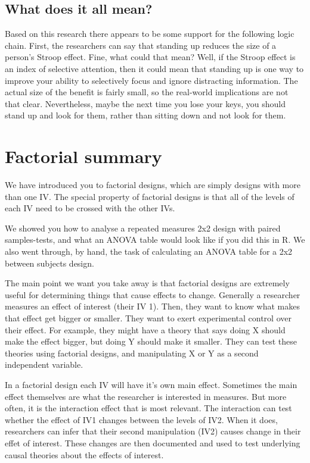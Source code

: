 \documentclass[
]{book}
\begin{document}
\subsection{What does it all mean?}\label{what-does-it-all-mean}

Based on this research there appears to be some support for the following logic chain. First, the researchers can say that standing up reduces the size of a person's Stroop effect. Fine, what could that mean? Well, if the Stroop effect is an index of selective attention, then it could mean that standing up is one way to improve your ability to selectively focus and ignore distracting information. The actual size of the benefit is fairly small, so the real-world implications are not that clear. Nevertheless, maybe the next time you lose your keys, you should stand up and look for them, rather than sitting down and not look for them.

\section{Factorial summary}\label{factorial-summary}

We have introduced you to factorial designs, which are simply designs with more than one IV. The special property of factorial designs is that all of the levels of each IV need to be crossed with the other IVs.

We showed you how to analyse a repeated measures 2x2 design with paired samples-tests, and what an ANOVA table would look like if you did this in R. We also went through, by hand, the task of calculating an ANOVA table for a 2x2 between subjects design.

The main point we want you take away is that factorial designs are extremely useful for determining things that cause effects to change. Generally a researcher measures an effect of interest (their IV 1). Then, they want to know what makes that effect get bigger or smaller. They want to exert experimental control over their effect. For example, they might have a theory that says doing X should make the effect bigger, but doing Y should make it smaller. They can test these theories using factorial designs, and manipulating X or Y as a second independent variable.

In a factorial design each IV will have it's own main effect. Sometimes the main effect themselves are what the researcher is interested in measures. But more often, it is the interaction effect that is most relevant. The interaction can test whether the effect of IV1 changes between the levels of IV2. When it does, researchers can infer that their second manipulation (IV2) causes change in their effet of interest. These changes are then documented and used to test underlying causal theories about the effects of interest.
\end{document}
